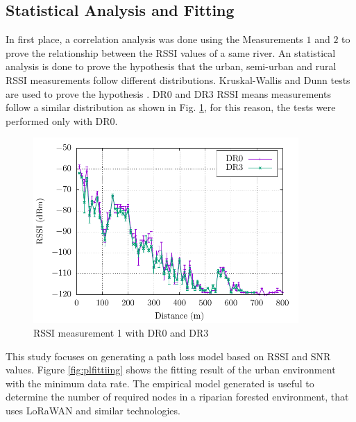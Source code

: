 \subsection{Statistical Analysis and Fitting}
\label{sub:statistical}
In first place, a correlation analysis was done using the Measurements $1$ and $2$ to prove the relationship between the RSSI values of a same river.
An statistical analysis is done to prove the hypothesis that the urban, semi-urban and rural RSSI measurements follow different distributions. Kruskal-Wallis and Dunn tests are used to prove the hypothesis \cite{Mendenhall2010}. DR$0$ and DR$3$ RSSI means measurements follow a similar distribution as shown in Fig. \ref{fig:rssimeasurement}, for this reason, the tests were performed only with DR$0$.

\begin{figure}[h!]
  \centering
  \includegraphics[width=0.9\textwidth]{Figure4}
  \caption{RSSI measurement 1 with DR$0$ and DR$3$}
  \label{fig:rssimeasurement}
\end{figure}

This study focuses on generating a path loss model based on RSSI and SNR values. Figure \ref{fig:plfittiing} shows the fitting result of the urban environment with the minimum data rate. The empirical model generated is useful to determine the number of required nodes in a riparian forested environment, that uses LoRaWAN and similar technologies.

